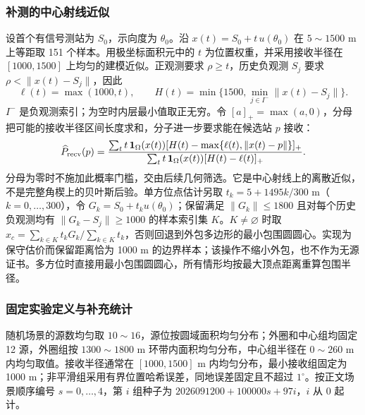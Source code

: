 \subsubsection{补测的中心射线近似}\label{app:q3prob}
设首个有信号测站为 $S_0$，示向度为 $\theta_0$。沿 $x(t)=S_0+t\,u(\theta_0)$ 在 $5\sim1500$ m 上等距取 151 个样本。用极坐标面积元中的 $t$ 为位置权重，并采用接收半径在 $[1000,1500]$ 上均匀的建模近似。正观测要求 $\rho\ge t$，历史负观测 $S_j$ 要求 $\rho<\|x(t)-S_j\|$，因此
\[
 \ell(t)=\max(1000,t),\qquad
 H(t)=\min\{1500,\min_{j\in I^-}\|x(t)-S_j\|\}.
\]
$I^-$ 是负观测索引；为空时内层最小值取正无穷。令 $[a]_+=\max(a,0)$，分母把可能的接收半径区间长度求和，分子进一步要求能在候选站 $p$ 接收：
\begin{equation}\label{eq:q3-prob}
 \widehat P_{\rm recv}(p)=
 \frac{\sum_t t\,\mathbf1_\Omega(x(t))
 [H(t)-\max\{\ell(t),\|x(t)-p\|\}]_+}
 {\sum_t t\,\mathbf1_\Omega(x(t))[H(t)-\ell(t)]_+}.
\end{equation}
分母为零时不施加此概率门槛，交由后续几何筛选。它是中心射线上的离散近似，不是完整角楔上的贝叶斯后验。单方位点估计另取 $t_k=5+1495k/300$ m（$k=0,\ldots,300$），令 $G_k=S_0+t_ku(\theta_0)$；保留满足 $\|G_k\|\le1800$ 且对每个历史负观测均有 $\|G_k-S_j\|\ge1000$ 的样本索引集 $K$。$K\ne\varnothing$ 时取 $\hat x_c=\sum_{k\in K}t_kG_k/\sum_{k\in K}t_k$，否则回退到外包多边形的最小包围圆圆心。实现为保守估价而保留距离恰为 1000 m 的边界样本；该操作不缩小外包，也不作为无源证书。多方位时直接用最小包围圆圆心，所有情形均按最大顶点距离重算包围半径。

\subsubsection{固定实验定义与补充统计}
随机场景的源数均匀取 $10\sim16$，源位按圆域面积均匀分布；外圈和中心组均固定 12 源，外圈组按 $1300\sim1800$ m 环带内面积均匀分布，中心组半径在 $0\sim260$ m 内均匀取值。接收半径通常在 $[1000,1500]$ m 内均匀分布，最小接收组固定为 1000 m；非平滑组采用有界位置哈希误差，同地误差固定且不超过 $1^\circ$。按正文场景顺序编号 $s=0,\ldots,4$，第 $i$ 组种子为 $2026091200+100000s+97i$，$i$ 从 0 起计。

